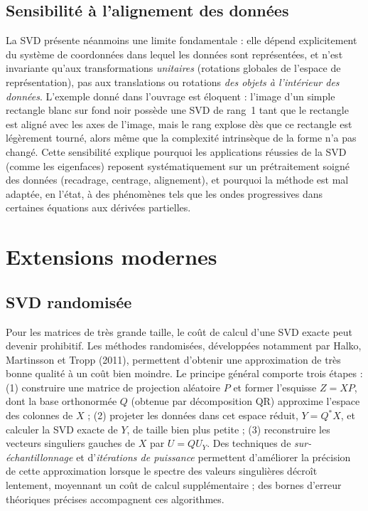 \documentclass[11pt,a4paper]{article}
\begin{document}
\subsection{Sensibilité à l'alignement des données}

La SVD présente néanmoins une limite fondamentale : elle dépend explicitement du système de coordonnées dans lequel les données sont représentées, et n'est invariante qu'aux transformations \emph{unitaires} (rotations globales de l'espace de représentation), pas aux translations ou rotations \emph{des objets à l'intérieur des données}. L'exemple donné dans l'ouvrage est éloquent : l'image d'un simple rectangle blanc sur fond noir possède une SVD de rang~1 tant que le rectangle est aligné avec les axes de l'image, mais le rang explose dès que ce rectangle est légèrement tourné, alors même que la complexité intrinsèque de la forme n'a pas changé. Cette sensibilité explique pourquoi les applications réussies de la SVD (comme les eigenfaces) reposent systématiquement sur un prétraitement soigné des données (recadrage, centrage, alignement), et pourquoi la méthode est mal adaptée, en l'état, à des phénomènes tels que les ondes progressives dans certaines équations aux dérivées partielles.

\section{Extensions modernes}

\subsection{SVD randomisée}

Pour les matrices de très grande taille, le coût de calcul d'une SVD exacte peut devenir prohibitif. Les méthodes randomisées, développées notamment par Halko, Martinsson et Tropp (2011), permettent d'obtenir une approximation de très bonne qualité à un coût bien moindre. Le principe général comporte trois étapes : (1) construire une matrice de projection aléatoire $P$ et former l'esquisse $Z = XP$, dont la base orthonormée $Q$ (obtenue par décomposition QR) approxime l'espace des colonnes de $X$ ; (2) projeter les données dans cet espace réduit, $Y = Q^{*}X$, et calculer la SVD exacte de $Y$, de taille bien plus petite ; (3) reconstruire les vecteurs singuliers gauches de $X$ par $U = QU_Y$. Des techniques de \emph{sur-échantillonnage} et d'\emph{itérations de puissance} permettent d'améliorer la précision de cette approximation lorsque le spectre des valeurs singulières décroît lentement, moyennant un coût de calcul supplémentaire ; des bornes d'erreur théoriques précises accompagnent ces algorithmes.
\end{document}
